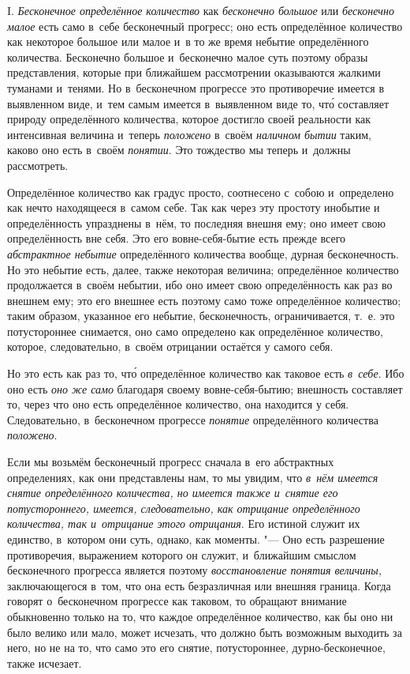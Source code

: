 
I. {\em Бесконечное определённое количество} как {\em бесконечно большое} или
{\em бесконечно малое} есть само в~себе бесконечный прогресс; оно есть
определённое количество как некоторое большое или малое и~в то же время
небытие определённого количества. Бесконечно большое и~бесконечно малое суть
поэтому образы представления, которые при ближайшем рассмотрении оказываются
жалкими туманами и~тенями. Но в~бесконечном прогрессе это противоречие имеется
в выявленном виде, и~тем самым имеется в~выявленном виде то, чт\'{о} составляет
природу определённого количества, которое достигло своей реальности как
интенсивная величина и~теперь {\em положено} в~своём {\em наличном бытии}
таким, каково оно есть в~своём {\em понятии}. Это тождество мы теперь и~должны
рассмотреть.

Определённое количество как градус просто, соотнесено с~собою и~определено как
нечто находящееся в~самом себе. Так как через эту простоту инобытие
и определённость упразднены в~нём, то последняя внешня ему; оно имеет свою
определённость вне себя. Это его вовне-себя-бытие есть прежде всего
{\em абстрактное небытие} определённого количества вообще, дурная
бесконечность. Но это небытие есть, далее, также некоторая величина;
определённое количество продолжается в~своём небытии, ибо оно имеет свою
определённость как раз во внешнем ему; это его внешнее есть поэтому само тоже
определённое количество; таким образом, указанное его небытие, бесконечность,
ограничивается, т.~е. это потустороннее снимается, оно само определено как
определённое количество, которое, следовательно, в~своём отрицании остаётся
у самого себя.

Но это есть как раз то, чт\'{о} определённое количество как таковое есть
{\em в~себе}. Ибо оно есть {\em оно же само} благодаря своему вовне-себя-бытию;
внешность составляет то, через что оно есть определённое количество, она находится
у себя. Следовательно, в~бесконечном прогрессе {\em понятие} определённого
количества {\em положено}.

Если мы возьмём бесконечный прогресс сначала в~его абстрактных определениях,
как они представлены нам, то мы увидим, что {\em в~нём имеется снятие
определённого количества, но имеется также и~снятие его потустороннего,
имеется, следовательно, как отрицание определённого количества, так и~отрицание
этого отрицания}. Его истиной служит их единство, в~котором они суть, однако,
как моменты. "--- Оно есть разрешение противоречия, выражением которого он
служит, и~ближайшим смыслом бесконечного прогресса является поэтому
{\em восстановление понятия величины,} заключающегося в~том, что она есть
безразличная или внешняя граница. Когда говорят о~бесконечном прогрессе как
таковом, то обращают внимание обыкновенно только на то, что каждое определённое
количество, как бы оно ни было велико или мало, может исчезать, что должно быть
возможным выходить за него, но не на то, что само это его снятие,
потустороннее, дурно-бесконечное, также исчезает.


